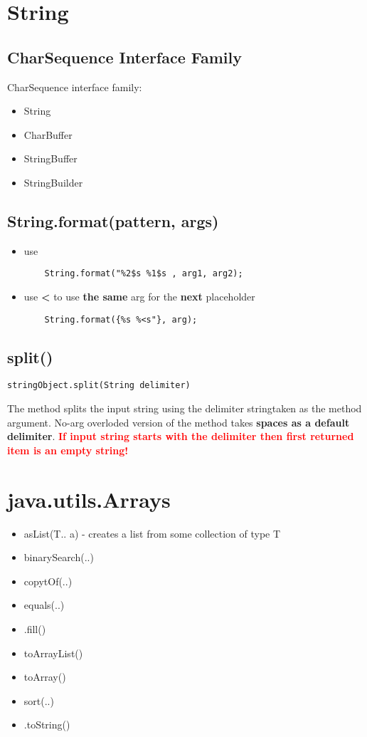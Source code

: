 \documentclass{report}
\begin{document}
\chapter{String}
\section{CharSequence Interface Family}
CharSequence interface family:
\begin{itemize}
	\item String
	\item CharBuffer
	\item StringBuffer
	\item StringBuilder
\end{itemize}

\section{String.format(pattern, args)}
\begin{itemize}
	\item use%
	\begin{verbatim}
	String.format("%2$s %1$s , arg1, arg2);
	\end{verbatim}
	\item use \textbf{\textless} to use \textbf{the same} arg for the \textbf{next} placeholder
	\begin{verbatim}
	String.format({%s %<s"}, arg);
	\end{verbatim}
\end{itemize}

\section{split()}
\begin{verbatim}
stringObject.split(String delimiter)
\end{verbatim}
The method splits the input string using the delimiter stringtaken as the method argument. No-arg overloded version of the method takes
\textbf{spaces as a default delimiter}.
\textbf{\textcolor{red}{If  input string starts with the delimiter then first returned item is an empty string!}}

\chapter{java.utils.Arrays}
\begin{itemize}
	\item asList(T.. a)  - creates a list from some collection of type T
	\item binarySearch(..)
	\item copytOf(..)
	\item equals(..)
	\item .fill()
	\item toArrayList()
	\item toArray()
	\item sort(..)
	\item .toString()
\end{itemize}
\end{document}
